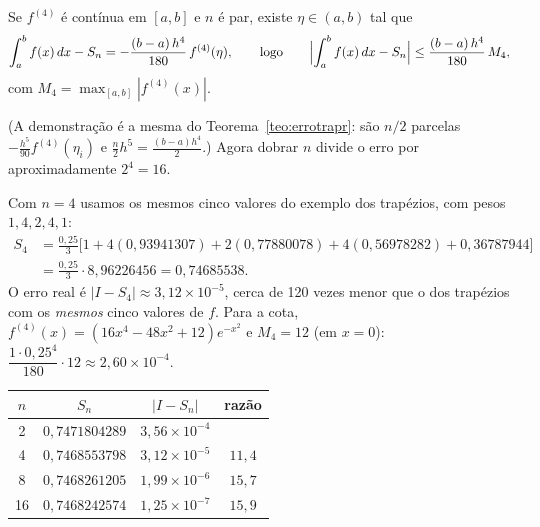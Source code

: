 \begin{teorema}
Se $f^{(4)}$ é contínua em $[a,b]$ e $n$ é par, existe $\eta\in(a,b)$ tal que
\[
\int_a^b f(x)\,dx-S_n=-\frac{(b-a)\,h^4}{180}\,f^{(4)}(\eta),
\qquad\text{logo}\qquad
\Bigl|\int_a^b f(x)\,dx-S_n\Bigr|\le\frac{(b-a)\,h^4}{180}\,M_4,
\]
com $M_4=\max_{[a,b]}|f^{(4)}(x)|$.
\end{teorema}

(A demonstração é a mesma do Teorema~\ref{teo:errotrapr}: são $n/2$ parcelas
$-\frac{h^5}{90}f^{(4)}(\eta_i)$ e $\frac n2h^5=\frac{(b-a)h^4}{2}$.)
Agora dobrar $n$ divide o erro por aproximadamente $2^4=16$.

\begin{exemplo}
Com $n=4$ usamos os mesmos cinco valores do exemplo dos trapézios, com pesos
$1,4,2,4,1$:
\begin{align*}
S_4&=\frac{0{,}25}{3}\bigl[1+4(0{,}93941307)+2(0{,}77880078)+4(0{,}56978282)+0{,}36787944\bigr]\\
&=\frac{0{,}25}{3}\cdot8{,}96226456=0{,}74685538.
\end{align*}
O erro real é $|I-S_4|\approx3{,}12\times10^{-5}$, cerca de 120 vezes menor que o dos
trapézios com os \emph{mesmos} cinco valores de $f$. Para a cota,
$f^{(4)}(x)=(16x^4-48x^2+12)e^{-x^2}$ e $M_4=12$ (em $x=0$):
$\dfrac{1\cdot0{,}25^4}{180}\cdot12\approx2{,}60\times10^{-4}$.
\begin{center}
\renewcommand{\arraystretch}{1.3}
\begin{tabular}{c|c|c|c}
$n$ & $S_n$ & $|I-S_n|$ & razão\\ \hline
2 & $0{,}7471804289$ & $3{,}56\times10^{-4}$ & \\
4 & $0{,}7468553798$ & $3{,}12\times10^{-5}$ & $11{,}4$\\
8 & $0{,}7468261205$ & $1{,}99\times10^{-6}$ & $15{,}7$\\
16 & $0{,}7468242574$ & $1{,}25\times10^{-7}$ & $15{,}9$
\end{tabular}
\end{center}
\end{exemplo}

